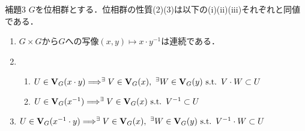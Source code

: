 \documentclass[a4paper,11pt]{jsarticle}
\newcommand{\st}{\mathrm{s.t.}\,}  %
\begin{document}
%
%
%
\begin{itembox}[l]{補題3}
$G$を位相群とする．位相群の性質(2)(3)は以下の(i)(ii)(iii)それぞれと同値である．
\vspace{-0.7zh}%
\begin{enumerate}
\renewcommand{\labelenumi}{(\roman{enumi})}
\item $G\times G$から$G$への写像$(x,y)\mapsto x\cdot y^{-1}$は連続である．
\item
\begin{enumerate}
\renewcommand{\labelenumi}{(\alph{enumi})}
\item $U\in{\bf V}_G(x\cdot y) \Longrightarrow ^\exists V\in{\bf V}_G(x),{\ } ^\exists W\in{\bf V}_G(y){\ }\st{\ }V\cdot W\subset U$
\item $U\in{\bf V}_G(x^{-1}) \Longrightarrow ^\exists V\in{\bf V}_G(x){\ }\st{\ }V^{-1}\subset U$
\end{enumerate}
\item $U\in{\bf V}_G(x^{-1}\cdot y) \Longrightarrow ^\exists V\in{\bf V}_G(x),{\ } ^\exists W\in{\bf V}_G(y){\ }\st{\ }V^{-1}\cdot W\subset U$
\end{enumerate}
\end{itembox}
\vspace{-0.7zh}%
\vspace{-0.7zh}%
\end{document}
